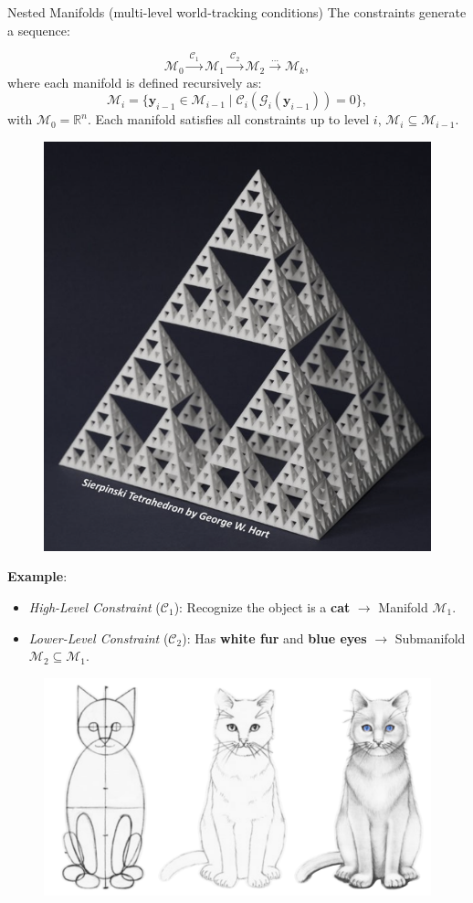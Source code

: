 \begin{frame}{Nested Manifolds (multi-level world-tracking conditions)}
    The constraints generate a sequence:

    \begin{equation*}
        \mathcal{M}_0 \xrightarrow{\ \mathcal{C}_1\ } \mathcal{M}_1 \xrightarrow{\ \mathcal{C}_2\ } \mathcal{M}_2 \xrightarrow{\ \dots\ } \mathcal{M}_k,
    \end{equation*}
    where each manifold is defined recursively as:
    \begin{equation*}
        \mathcal{M}_i = \{\mathbf{y}_{i-1} \in \mathcal{M}_{i-1} \mid \mathcal{C}_i(\mathcal{G}_i(\mathbf{y}_{i-1})) = 0\},
    \end{equation*}
    with $\mathcal{M}_0 = \mathbb{R}^n$.
    Each manifold satisfies all constraints up to level $i$,  
    $
        \mathcal{M}_i \subseteq \mathcal{M}_{i-1}.
    $
    
    \begin{figure}
        \centering
        \includegraphics[width=0.2\linewidth]{image4.png}
    \end{figure}
\end{frame}
\begin{frame}
    \textbf{Example}:
    \begin{itemize}
        \item \textit{High-Level Constraint} ($\mathcal{C}_1$): Recognize the object is a \textbf{cat} $\rightarrow$ Manifold $\mathcal{M}_1$.
        \item \textit{Lower-Level Constraint} ($\mathcal{C}_2$): Has \textbf{white fur} and \textbf{blue eyes} $\rightarrow$ Submanifold $\mathcal{M}_2 \subseteq \mathcal{M}_1$.
    \end{itemize}

    \begin{figure}
        \centering
        \includegraphics[width=0.5\linewidth]{image10.png}
    \end{figure}
\end{frame}

